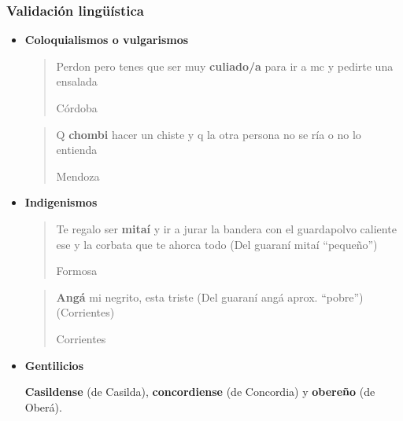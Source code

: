 \begin{frame}[t]\frametitle{Validación lingüística}

   \begin{itemize}

      \label{it:caracterizacionLinguistica}

      \item \textbf{Coloquialismos o vulgarismos}

      \blockquote[Córdoba]{Perdon pero tenes que ser muy \textbf{culiado/a} para ir a mc y pedirte una ensalada}


      \blockquote[Mendoza]{Q \textbf{chombi} hacer un chiste y q la otra persona no se ría o no lo entienda}





      \item \textbf{Indigenismos}

      \blockquote[Formosa]{Te regalo ser \textbf{mitaí} y ir a jurar la bandera con el guardapolvo caliente ese y la corbata que te ahorca todo (Del guaraní mitaí “pequeño”)}

      \blockquote[Corrientes]{\textbf{Angá} mi negrito, esta triste (Del guaraní angá aprox. “pobre”) (Corrientes)}

      \item \textbf{Gentilicios}

      \textbf{Casildense} (de Casilda), \textbf{concordiense} (de Concordia) y \textbf{obereño} (de Oberá).

\end{itemize}





\end{frame}
